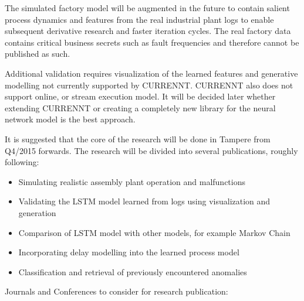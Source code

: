 \documentclass[a4paper,10pt]{article}
\begin{document}
The simulated factory model will be augmented in the future to contain salient process dynamics and features from the real industrial plant logs to enable subsequent
derivative research and faster iteration cycles. The real factory data contains critical business secrets such as fault frequencies and therefore cannot be published as such.

Additional validation requires visualization of the learned features and generative modelling not currently supported by CURRENNT.
CURRENNT also does not support online, or stream execution model. It will be decided later whether extending CURRENNT or creating a completely new library for
the neural network model is the best approach.

It is suggested that the core of the research will be done in Tampere from Q4/2015 forwards.
The research will be divided into several publications, roughly following:
\begin{itemize}
 \item Simulating realistic assembly plant operation and malfunctions
 \item Validating the LSTM model learned from logs using visualization and generation
 \item Comparison of LSTM model with other models, for example Markov Chain
 \item Incorporating delay modelling into the learned process model
 \item Classification and retrieval of previously encountered anomalies
\end{itemize}
Journals and Conferences to consider for research publication:
\end{document}
